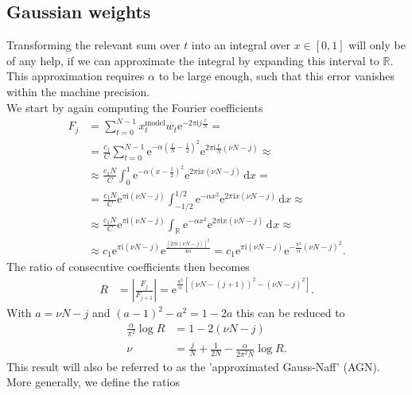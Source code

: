 \documentclass[english, parskip=full]{scrartcl}
\newcommand{\intx}{}
\newcommand{\intr}{}
\newcommand{\kla}{}
\newcommand{\klam}{}
\newcommand{\tecxt}{}
\newcommand{\I}{\text{i}}
\newcommand{\e}{\text{e}}
\begin{document}
\subsection{Gaussian weights}
Transforming the relevant sum over $t$ into an integral over $x\in[0,1]$ will only be of any help, if we can approximate the integral by expanding this interval to $\mathbb{R}$.
This approximation requires $\alpha$ to be large enough, such that this error vanishes within the machine precision. 
\\
We start by again computing the Fourier coefficients
\begin{align}
F_j&=\sum_{t=0}^{N-1}x_t^\tecxt\text{model}w_t\e^{-2\pi\I j\frac{t}{N}}=\\
&=\frac{c_1}{C}\sum_{t=0}^{N-1}\e^{-\alpha\kla\left( {\frac{t}{N}-\frac{1}{2}} \right)^2}\e^{2\pi\I \frac{t}{N}\kla\left( {\nu N - j} \right)}\approx\\
&\approx\frac{c_1N}{C}\intx\int_{0}^{1}\e^{-\alpha\kla\left( {x-\frac{1}{2}} \right)^2}\e^{2\pi\I x\kla\left( {\nu N - j} \right)}\,\mathrm{d}x=\\
&=\frac{c_1N}{C}\e^{\pi\I (\nu N-j)}\intx\int_{-1/2}^{1/2}\e^{-\alpha x^2}\e^{2\pi\I x\kla\left( {\nu N - j} \right)}\,\mathrm{d}x\approx\\
&\approx\frac{c_1N}{C}\e^{\pi\I (\nu N-j)}\intr\int_{\mathbb{R}^{ }}\e^{-\alpha x^2}\e^{2\pi\I x\kla\left( {\nu N - j} \right)}\,\mathrm{d}^{ }x\approx\\
&\approx c_1\e^{\pi\I (\nu N-j)}\e^{\frac{\left[2\pi\I(\nu N-j)\right]^2}{4\alpha}}=c_1\e^{\pi\I (\nu N-j)}\e^{-\frac{\pi^2}{\alpha}(\nu N-j)^2}. \label{eqn:Fj-gauss}
\end{align}
The ratio of consecutive coefficients then becomes
\begin{align}
R&=\left\vert\frac{F_j}{F_{j+1}}\right\vert=\e^{\frac{\pi^2}{\alpha}\klam\left[ {(\nu N-(j+1))^2-(\nu N-j)^2} \right]}.
\end{align}
With $a=\nu N-j$ and $(a-1)^2-a^2=1-2a$ this can be reduced to
\begin{align}
\frac{\alpha}{\pi^2}\log R&=1-2(\nu N-j)\\
\nu&=\frac{j}{N}+\frac{1}{2N}-\frac{\alpha}{2\pi^2N}\log R. \label{eqn:ApproxGaussNaff}
\end{align}
This result will also be referred to as the 'approximated Gauss-Naff' (AGN).
\\
More generally, we define the ratios
\end{document}
